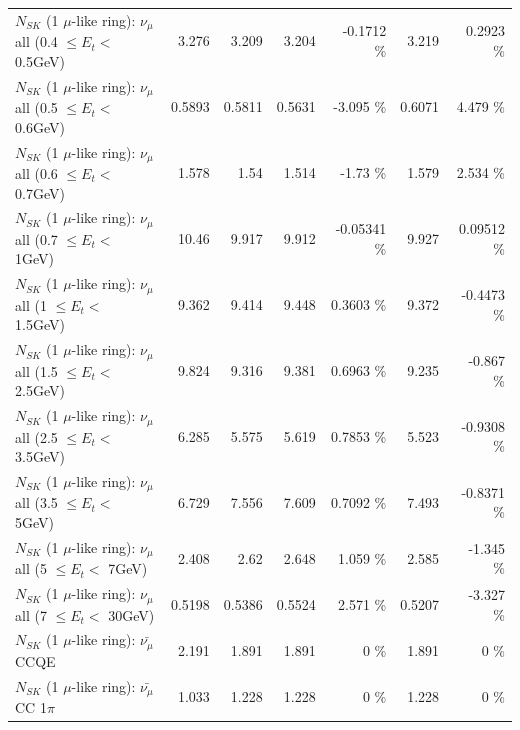 \begin{table}
\begin{tabular}{| l | r | r | r  r | r  r |}
       $N_{SK}$ (1 $\mu$-like ring): $\nu_{\mu}$ all (0.4 $\leq E_{t} <$ 0.5GeV) &           3.276 &           3.209 &           3.204 &  -0.1712 \%  &           3.219 &   0.2923 \%  \\ 
       $N_{SK}$ (1 $\mu$-like ring): $\nu_{\mu}$ all (0.5 $\leq E_{t} <$ 0.6GeV) &          0.5893 &          0.5811 &          0.5631 &   -3.095 \%  &          0.6071 &    4.479 \%  \\ 
       $N_{SK}$ (1 $\mu$-like ring): $\nu_{\mu}$ all (0.6 $\leq E_{t} <$ 0.7GeV) &           1.578 &            1.54 &           1.514 &    -1.73 \%  &           1.579 &    2.534 \%  \\ 
         $N_{SK}$ (1 $\mu$-like ring): $\nu_{\mu}$ all (0.7 $\leq E_{t} <$ 1GeV) &           10.46 &           9.917 &           9.912 & -0.05341 \%  &           9.927 &  0.09512 \%  \\ 
         $N_{SK}$ (1 $\mu$-like ring): $\nu_{\mu}$ all (1 $\leq E_{t} <$ 1.5GeV) &           9.362 &           9.414 &           9.448 &   0.3603 \%  &           9.372 &  -0.4473 \%  \\ 
       $N_{SK}$ (1 $\mu$-like ring): $\nu_{\mu}$ all (1.5 $\leq E_{t} <$ 2.5GeV) &           9.824 &           9.316 &           9.381 &   0.6963 \%  &           9.235 &   -0.867 \%  \\ 
       $N_{SK}$ (1 $\mu$-like ring): $\nu_{\mu}$ all (2.5 $\leq E_{t} <$ 3.5GeV) &           6.285 &           5.575 &           5.619 &   0.7853 \%  &           5.523 &  -0.9308 \%  \\ 
         $N_{SK}$ (1 $\mu$-like ring): $\nu_{\mu}$ all (3.5 $\leq E_{t} <$ 5GeV) &           6.729 &           7.556 &           7.609 &   0.7092 \%  &           7.493 &  -0.8371 \%  \\ 
           $N_{SK}$ (1 $\mu$-like ring): $\nu_{\mu}$ all (5 $\leq E_{t} <$ 7GeV) &           2.408 &            2.62 &           2.648 &    1.059 \%  &           2.585 &   -1.345 \%  \\ 
          $N_{SK}$ (1 $\mu$-like ring): $\nu_{\mu}$ all (7 $\leq E_{t} <$ 30GeV) &          0.5198 &          0.5386 &          0.5524 &    2.571 \%  &          0.5207 &   -3.327 \%  \\ 
\hline
\hline
\hline
                              $N_{SK}$ (1 $\mu$-like ring): $\bar{\nu_\mu}$ CCQE &           2.191 &           1.891 &           1.891 &        0 \%  &           1.891 &        0 \%  \\ 
                         $N_{SK}$ (1 $\mu$-like ring): $\bar{\nu_\mu}$ CC 1$\pi$ &           1.033 &           1.228 &           1.228 &        0 \%  &           1.228 &        0 \%  \\ 

\end{tabular}
\end{table}
